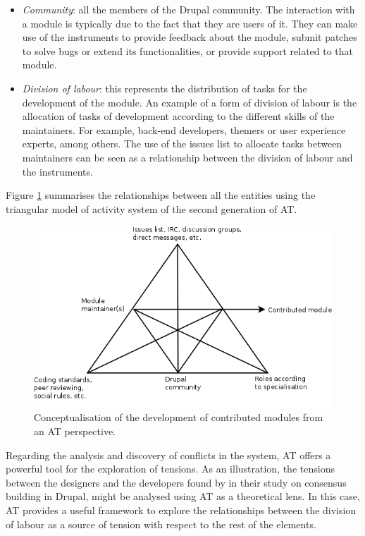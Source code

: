 \documentclass[a4paper, 12pt]{article}
\begin{document}
\begin{itemize}
	\item \textit{Community}: all the members of the Drupal community. The interaction with a module is typically due to the fact that they are users of it. They can make use of the instruments to provide feedback about the module, submit patches to solve bugs or extend its functionalities, or provide support related to that module. 
	\item \textit{Division of labour}: this represents the distribution of tasks for the development of the module. An example of a form of division of labour is the allocation of tasks of development according to the different skills of the maintainers. For example, back-end developers, themers or user experience experts, among others. The use of the issues list to allocate tasks between maintainers can be seen as a relationship between the division of labour and the instruments.
\end{itemize}

Figure \ref{drupal_module_at} summarises the relationships between all the entities using the triangular model of activity system of the second generation of AT.

\begin{figure}[h]
	\centering
	\includegraphics[scale=0.5]{diagrams/drupal_module_at.png}
	\caption{Conceptualisation of the development of contributed modules from an AT perspective.}
	\label{drupal_module_at}
\end{figure}

Regarding the analysis and discovery of conflicts in the system, AT offers a powerful tool for the exploration of tensions. As an illustration, the tensions between the designers and the developers found by \textcite{Zilouchian2011} in their study on consensus building in Drupal, might be analysed using AT as a theoretical lens. In this case, AT provides a useful framework to explore the relationships between the division of labour as a source of tension with respect to the rest of the elements.
\end{document}
